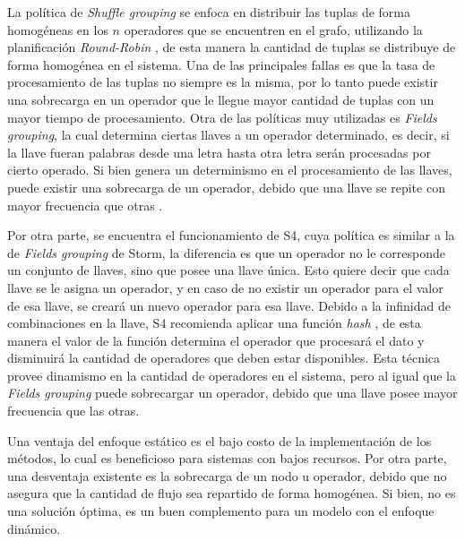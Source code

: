 La política de \textit{Shuffle grouping} se enfoca en distribuir las tuplas de forma homogéneas en los $n$ operadores que se encuentren en el grafo, utilizando la planificación \textit{Round-Robin} \citep{bookScheduling}, de esta manera la cantidad de tuplas se distribuye de forma homogénea en el sistema. Una de las principales fallas es que la tasa de procesamiento de las tuplas no siempre es la misma, por lo tanto puede existir una sobrecarga en un operador que le llegue mayor cantidad de tuplas con un mayor tiempo de procesamiento. Otra de las políticas muy utilizadas es \textit{Fields grouping}, la cual determina ciertas llaves a un operador determinado, es decir, si la llave fueran palabras desde una letra hasta otra letra serán procesadas por cierto operado. Si bien genera un determinismo en el procesamiento de las llaves, puede existir una sobrecarga de un operador, debido que una llave se repite con mayor frecuencia que otras \citep{bookstorm}.


Por otra parte, se encuentra el funcionamiento de S4, cuya política es similar a la de \textit{Fields grouping} de Storm, la diferencia es que un operador no le corresponde un conjunto de llaves, sino que posee una llave única. Esto quiere decir que cada llave se le asigna un operador, y en caso de no existir un operador para el valor de esa llave, se creará un nuevo operador para esa llave. Debido a la infinidad de combinaciones en la llave, S4 recomienda aplicar una función \textit{hash} \citep{RogawayS04}, de esta manera el valor de la función determina el operador que procesará el dato y disminuirá la cantidad de operadores que deben estar disponibles. Esta técnica provee dinamismo en la cantidad de operadores en el sistema, pero al igual que la \textit{Fields grouping} puede sobrecargar un operador, debido que una llave posee mayor frecuencia que las otras.

Una ventaja del enfoque estático es el bajo costo de la implementación de los métodos, lo cual es beneficioso para sistemas con bajos recursos. Por otra parte, una desventaja existente es la sobrecarga de un nodo u operador, debido que no asegura que la cantidad de flujo sea repartido de forma homogénea. Si bien, no es una solución óptima, es un buen complemento para un modelo con el enfoque dinámico.

